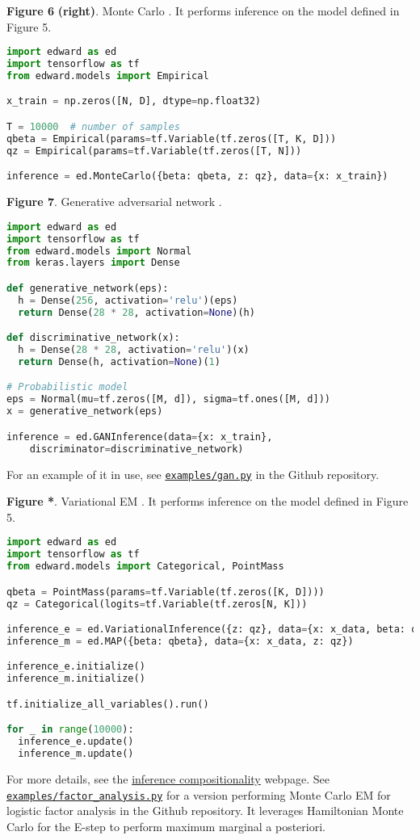 \textbf{Figure 6} \textbf{(right)}. Monte Carlo \citep{robert1999monte}.
It performs inference on the model defined in Figure 5.
\begin{lstlisting}[language=python]
import edward as ed
import tensorflow as tf
from edward.models import Empirical

x_train = np.zeros([N, D], dtype=np.float32)

T = 10000  # number of samples
qbeta = Empirical(params=tf.Variable(tf.zeros([T, K, D]))
qz = Empirical(params=tf.Variable(tf.zeros([T, N]))

inference = ed.MonteCarlo({beta: qbeta, z: qz}, data={x: x_train})
\end{lstlisting}

\textbf{Figure 7}. Generative adversarial network
\citep{goodfellow2014generative}.
\begin{lstlisting}[language=python]
import edward as ed
import tensorflow as tf
from edward.models import Normal
from keras.layers import Dense

def generative_network(eps):
  h = Dense(256, activation='relu')(eps)
  return Dense(28 * 28, activation=None)(h)

def discriminative_network(x):
  h = Dense(28 * 28, activation='relu')(x)
  return Dense(h, activation=None)(1)

# Probabilistic model
eps = Normal(mu=tf.zeros([M, d]), sigma=tf.ones([M, d]))
x = generative_network(eps)

inference = ed.GANInference(data={x: x_train},
    discriminator=discriminative_network)
\end{lstlisting}
For an example of it in use, see
\href{https://github.com/blei-lab/edward/blob/master/examples/gan.py}{\texttt{examples/gan.py}}
in the Github repository.

\textbf{Figure *}. Variational EM \citep{neal1993new}.
It performs inference on the model defined in Figure 5.
\begin{lstlisting}[language=python]
import edward as ed
import tensorflow as tf
from edward.models import Categorical, PointMass

qbeta = PointMass(params=tf.Variable(tf.zeros([K, D])))
qz = Categorical(logits=tf.Variable(tf.zeros[N, K]))

inference_e = ed.VariationalInference({z: qz}, data={x: x_data, beta: qbeta})
inference_m = ed.MAP({beta: qbeta}, data={x: x_data, z: qz})

inference_e.initialize()
inference_m.initialize()

tf.initialize_all_variables().run()

for _ in range(10000):
  inference_e.update()
  inference_m.update()
\end{lstlisting}
For more details, see the
\href{/api/inference-compositionality}{inference compositionality} webpage.
See
\href{https://github.com/blei-lab/edward/blob/master/examples/factor_analysis.py}{\texttt{examples/factor_analysis.py}} for
a version performing Monte Carlo EM for logistic factor analysis
in the Github repository.
It leverages Hamiltonian Monte Carlo for the E-step to perform maximum
marginal a posteriori.

